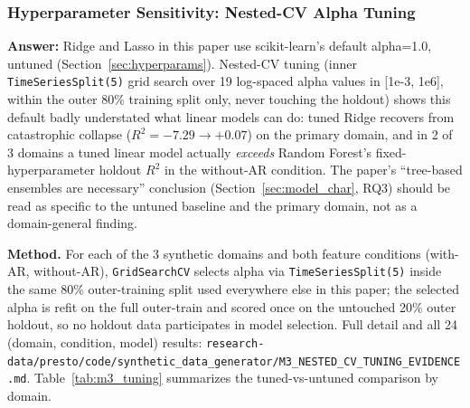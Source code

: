 \documentclass[technologies,article,submit,pdftex,moreauthors]{Definitions/mdpi}
\begin{document}
\subsubsection{Hyperparameter Sensitivity: Nested-CV Alpha
Tuning}\label{sec:m3_tuning}

\textbf{Answer:} Ridge and Lasso in this paper use scikit-learn's
default alpha=1.0, untuned (Section~\ref{sec:hyperparams}). Nested-CV tuning (inner
\texttt{TimeSeriesSplit(5)} grid search over 19 log-spaced alpha values
in {[}1e-3, 1e6{]}, within the outer 80\% training split only, never
touching the holdout) shows this default badly understated what linear
models can do: tuned Ridge recovers from catastrophic collapse
(\(R^2=-7.29\to+0.07\)) on the primary domain, and in 2 of 3 domains a
tuned linear model actually \emph{exceeds} Random Forest's
fixed-hyperparameter holdout \(R^2\) in the without-AR condition. The
paper's ``tree-based ensembles are necessary'' conclusion (Section~\ref{sec:model_char},
RQ3) should be read as specific to the untuned baseline and the primary
domain, not as a domain-general finding.

\textbf{Method.} For each of the 3 synthetic domains and both feature
conditions (with-AR, without-AR), \texttt{GridSearchCV} selects alpha
via \texttt{TimeSeriesSplit(5)} inside the same 80\% outer-training
split used everywhere else in this paper; the selected alpha is refit on
the full outer-train and scored once on the untouched 20\% outer
holdout, so no holdout data participates in model selection. Full detail
and all 24 (domain, condition, model) results:
\texttt{research-data/\allowbreak presto/\allowbreak code/\allowbreak synthetic\_\allowbreak data\_\allowbreak generator/\allowbreak M3\_\allowbreak NESTED\_\allowbreak CV\_\allowbreak TUNING\_\allowbreak EVIDENCE.md}. Table~\ref{tab:m3_tuning} summarizes the tuned-vs-untuned comparison by domain.
\end{document}

